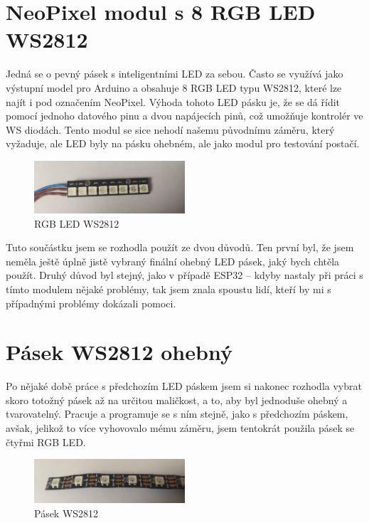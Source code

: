 \section{NeoPixel modul s 8 RGB LED WS2812}
Jedná se o pevný pásek s inteligentními LED za sebou. Často se využívá jako výstupní model pro Arduino a obsahuje 8 RGB LED typu WS2812,\cite {WS2812} které lze najít i pod označením NeoPixel\cite{Neopixel}. Výhoda tohoto LED pásku je, že se dá řídit pomocí jednoho datového pinu a dvou napájecích pinů, což umožňuje kontrolér ve WS diodách. Tento modul se sice nehodí našemu původnímu záměru, který vyžaduje, ale LED byly na pásku ohebném, ale jako modul pro testování postačí.

\begin{figure}[htbp]
	\centering
	\includegraphics[width=0.5\textwidth]{img/NeoPixel2.jpg}
	\caption{RGB LED WS2812}
\end{figure}

Tuto součástku jsem se rozhodla použít ze dvou důvodů. Ten první byl, že jsem neměla ještě úplně jistě vybraný finální ohebný LED pásek, jaký bych chtěla použít. Druhý důvod byl stejný, jako v případě ESP32 -- kdyby nastaly při práci s tímto modulem nějaké problémy, tak jsem znala spoustu lidí, kteří by mi s případnými problémy dokázali pomoci. 

\newpage

\section{Pásek WS2812 ohebný}
Po nějaké době práce s předchozím LED páskem jsem si nakonec rozhodla vybrat skoro totožný pásek až na určitou maličkost, a to, aby byl jednoduše ohebný a tvarovatelný. Pracuje a programuje se s ním stejně, jako s předchozím páskem, avšak, jelikož to více vyhovovalo mému záměru, jsem tentokrát použila pásek se čtyřmi RGB LED.\cite{Ohebny}


\begin{figure}[htbp]
	\centering
	\includegraphics[width=0.5\textwidth]{img/OhebnyLedPasek2.jpg}
	\caption{Pásek WS2812}
\end{figure}


